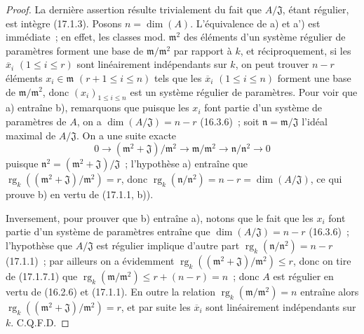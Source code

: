 \begin{proof}
La dernière assertion résulte trivialement du fait que $A/\mathfrak{J}$,
étant régulier, est intègre (17.1.3). Posons $n=\dim(A)$. L'équivalence de a)
et a') est immédiate~; en effet, les classes mod. $\mathfrak{m}^2$ des éléments
d'un système régulier de paramètres forment une base de
$\mathfrak{m}/\mathfrak{m}^2$ par rapport à $k$, et réciproquement, si les
$\overline{x}_i$ $(1\leq i\leq r)$ sont linéairement indépendants sur $k$, on
peut trouver $n-r$ éléments $x_i\in\mathfrak{m}$ $(r+1\leq i\leq n)$ tels que
les $\overline{x}_i$ $(1\leq i\leq n)$ forment une base de
$\mathfrak{m}/\mathfrak{m}^2$, donc $(x_i)_{1\leq i\leq n}$ est un système
régulier de paramètres. Pour voir que a) entraîne b), remarquons que puisque
les $x_i$ font partie d'un système de paramètres de $A$, on a
$\dim(A/\mathfrak{J})=n-r$ (16.3.6)~; soit
$\mathfrak{n}=\mathfrak{m}/\mathfrak{J}$ l'idéal maximal de
$A/\mathfrak{J}$. On a une suite exacte
\begin{equation}
\label{0.17.1.7.1-fr}
\tag{17.1.7.1}
  0\longrightarrow(\mathfrak{m}^2+\mathfrak{J})/\mathfrak{m}^2
  \longrightarrow\mathfrak{m}/\mathfrak{m}^2
  \longrightarrow\mathfrak{n}/\mathfrak{n}^2\longrightarrow0
\end{equation}
puisque $\mathfrak{n}^2=(\mathfrak{m}^2+\mathfrak{J})/\mathfrak{J}$~;
l'hypothèse a) entraîne que
$\operatorname{rg}_k((\mathfrak{m}^2+\mathfrak{J})/\mathfrak{m}^2)=r$, donc
$\operatorname{rg}_k(\mathfrak{n}/\mathfrak{n}^2)=n-r
=\dim(A/\mathfrak{J})$, ce qui prouve b) en vertu de (17.1.1, b)).

Inversement, pour prouver que b) entraîne a), notons que le fait que les $x_i$
font partie d'un système de paramètres entraîne que
$\dim(A/\mathfrak{J})=n-r$ (16.3.6)~; l'hypothèse que $A/\mathfrak{J}$ est
régulier implique d'autre part
$\operatorname{rg}_k(\mathfrak{n}/\mathfrak{n}^2)=n-r$ (17.1.1)~; par ailleurs
on a évidemment
$\operatorname{rg}_k((\mathfrak{m}^2+\mathfrak{J})/\mathfrak{m}^2)\leq r$,
donc on tire de (17.1.7.1) que
$\operatorname{rg}_k(\mathfrak{m}/\mathfrak{m}^2)\leq r+(n-r)=n$~; donc $A$
est régulier en vertu de (16.2.6) et (17.1.1). En outre la relation
$\operatorname{rg}_k(\mathfrak{m}/\mathfrak{m}^2)=n$ entraîne alors
$\operatorname{rg}_k((\mathfrak{m}^2+\mathfrak{J})/\mathfrak{m}^2)=r$, et par
suite les $\overline{x}_i$ sont linéairement indépendants sur $k$. C.Q.F.D.
\end{proof}


